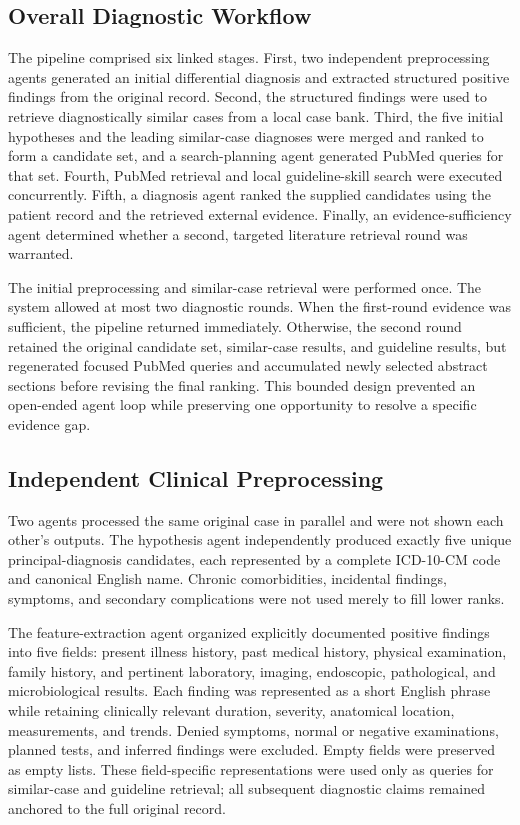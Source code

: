 \documentclass[10pt,letterpaper]{article}
\begin{document}
\subsection{Overall Diagnostic Workflow}

The pipeline comprised six linked stages. First, two independent preprocessing
agents generated an initial differential diagnosis and extracted structured
positive findings from the original record. Second, the structured findings were
used to retrieve diagnostically similar cases from a local case bank. Third, the
five initial hypotheses and the leading similar-case diagnoses were merged and
ranked to form a candidate set, and a search-planning agent generated PubMed
queries for that set. Fourth, PubMed retrieval and local guideline-skill search
were executed concurrently. Fifth, a diagnosis agent ranked the supplied
candidates using the patient record and the retrieved external evidence. Finally,
an evidence-sufficiency agent determined whether a second, targeted literature
retrieval round was warranted.

The initial preprocessing and similar-case retrieval were performed once. The
system allowed at most two diagnostic rounds. When the first-round evidence was
sufficient, the pipeline returned immediately. Otherwise, the second round
retained the original candidate set, similar-case results, and guideline results,
but regenerated focused PubMed queries and accumulated newly selected abstract
sections before revising the final ranking. This bounded design prevented an
open-ended agent loop while preserving one opportunity to resolve a specific
evidence gap.

\subsection{Independent Clinical Preprocessing}

Two agents processed the same original case in parallel and were not shown each
other's outputs. The hypothesis agent independently produced exactly five unique
principal-diagnosis candidates, each represented by a complete ICD-10-CM code and
canonical English name. Chronic comorbidities, incidental findings, symptoms,
and secondary complications were not used merely to fill lower ranks.

The feature-extraction agent organized explicitly documented positive findings
into five fields: present illness history, past medical history, physical
examination, family history, and pertinent laboratory, imaging, endoscopic,
pathological, and microbiological results. Each finding was represented as a
short English phrase while retaining clinically relevant duration, severity,
anatomical location, measurements, and trends. Denied symptoms, normal or
negative examinations, planned tests, and inferred findings were excluded. Empty
fields were preserved as empty lists. These field-specific representations were
used only as queries for similar-case and guideline retrieval; all subsequent
diagnostic claims remained anchored to the full original record.
\end{document}

